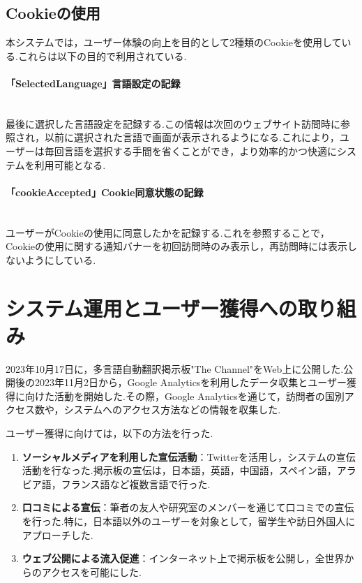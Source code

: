 \documentclass[b5paper,12pt,dvipdfmx]{jsreport}
\begin{document}
\newpage
\subsection*{Cookieの使用}

本システムでは，ユーザー体験の向上を目的として2種類のCookieを使用している.これらは以下の目的で利用されている.

\paragraph{「SelectedLanguage」言語設定の記録}\mbox{}\\
最後に選択した言語設定を記録する.この情報は次回のウェブサイト訪問時に参照され，以前に選択された言語で画面が表示されるようになる.これにより，ユーザーは毎回言語を選択する手間を省くことができ，より効率的かつ快適にシステムを利用可能となる.

\paragraph{「cookieAccepted」Cookie同意状態の記録}\mbox{}\\
ユーザーがCookieの使用に同意したかを記録する.これを参照することで，Cookieの使用に関する通知バナーを初回訪問時のみ表示し，再訪問時には表示しないようにしている.


\section{システム運用とユーザー獲得への取り組み}

2023年10月17日に，多言語自動翻訳掲示板"The Channel"をWeb上に公開した.公開後の2023年11月2日から，Google Analyticsを利用したデータ収集とユーザー獲得に向けた活動を開始した.その際，Google Analyticsを通じて，訪問者の国別アクセス数や，システムへのアクセス方法などの情報を収集した.

ユーザー獲得に向けては，以下の方法を行った.
\begin{enumerate}
    \item \textbf{ソーシャルメディアを利用した宣伝活動}：Twitterを活用し，システムの宣伝活動を行なった.掲示板の宣伝は，日本語，英語，中国語，スペイン語，アラビア語，フランス語など複数言語で行った.
    \item \textbf{口コミによる宣伝}：筆者の友人や研究室のメンバーを通じて口コミでの宣伝を行った.特に，日本語以外のユーザーを対象として，留学生や訪日外国人にアプローチした.
    \item \textbf{ウェブ公開による流入促進}：インターネット上で掲示板を公開し，全世界からのアクセスを可能にした.
\end{enumerate}
\end{document}
